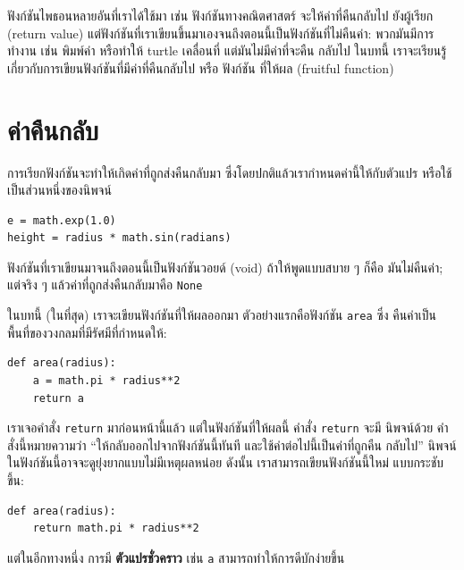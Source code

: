 ฟังก์ชันไพธอนหลายอันที่เราได้ใช้มา เช่น ฟังก์ชันทางคณิตศาสตร์ จะให้ค่าที่คืนกลับไป
ยังผู้เรียก (return value)  แต่ฟังก์ชันที่เราเขียนขึ้นมาเองจนถึงตอนนี้เป็นฟังก์ชันที่ไม่คืนค่า:
พวกมันมีการทำงาน เช่น พิมพ์ค่า หรือทำให้ turtle เคลื่อนที่ แต่มันไม่มีค่าที่จะคืน
กลับไป ในบทนี้ เราจะเรียนรู้เกี่ยวกับการเขียนฟังก์ชันที่มีค่าที่คืนกลับไป หรือ ฟังก์ชัน
ที่ให้ผล (fruitful function)

\section{ค่าคืนกลับ} %

การเรียกฟังก์ชันจะทำให้เกิดค่าที่ถูกส่งคืนกลับมา ซึ่งโดยปกติแล้วเรากำหนดค่านี้ให้กับตัวแปร
หรือใช้เป็นส่วนหนึ่งของนิพจน์

\begin{verbatim}
e = math.exp(1.0)
height = radius * math.sin(radians)
\end{verbatim}
%
ฟังก์ชันที่เราเขียนมาจนถึงตอนนี้เป็นฟังก์ชันวอยด์ (void) ถ้าให้พูดแบบสบาย ๆ ก็คือ มันไม่คืนค่า;
แต่จริง ๆ แล้วค่าที่ถูกส่งคืนกลับมาคือ {\tt None}

ในบทนี้ (ในที่สุด) เราจะเขียนฟังก์ชันที่ให้ผลออกมา ตัวอย่างแรกคือฟังก์ชัน {\tt area} ซึ่ง
คืนค่าเป็นพื้นที่ของวงกลมที่มีรัศมีที่กำหนดให้:


\begin{verbatim}
def area(radius):
    a = math.pi * radius**2
    return a
\end{verbatim}
%
เราเจอคำสั่ง {\tt return} มาก่อนหน้านี้แล้ว แต่ในฟังก์ชันที่ให้ผลนี้ คำสั่ง {\tt return} จะมี
นิพจน์ด้วย คำสั่งนี้หมายความว่า ``ให้กลับออกไปจากฟังก์ชันนี้ทันที และใช้ค่าต่อไปนี้เป็นค่าที่ถูกคืน
กลับไป'' นิพจน์ในฟังก์ชันนี้อาจจะดูยุ่งยากแบบไม่มีเหตุผลหน่อย ดังนั้น เราสามารถเขียนฟังก์ชันนี้ใหม่
แบบกระชับขึ้น:

\begin{verbatim}
def area(radius):
    return math.pi * radius**2
\end{verbatim}
%
แต่ในอีกทางหนึ่ง การมี {\bf ตัวแปรชั่วคราว} เช่น {\tt a} สามารถทำให้การดีบักง่ายขึ้น 


